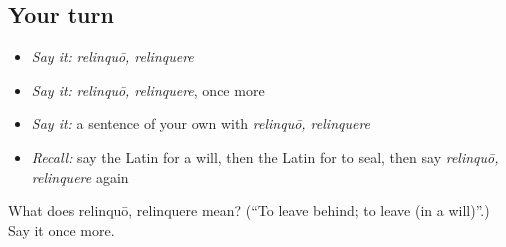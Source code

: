 \subsection*{Your turn}
\begin{itemize}
\raggedright
  \item \emph{Say it:} \emph{relinquō, relinquere}
  \item \emph{Say it:} \emph{relinquō, relinquere}, once more
  \item \emph{Say it:} a sentence of your own with \emph{relinquō, relinquere}
  \item \emph{Recall:} say the Latin for a will, then the Latin for to seal, then say \emph{relinquō, relinquere} again
\end{itemize}

\begin{tcolorbox}[breakable,colback=teal!4,colframe=teal!35!black,title={Before you move on}]
What does relinquō, relinquere mean? (\textquotedblleft{}To leave behind; to leave (in a will)\textquotedblright{}.) Say it once more.
\end{tcolorbox}

